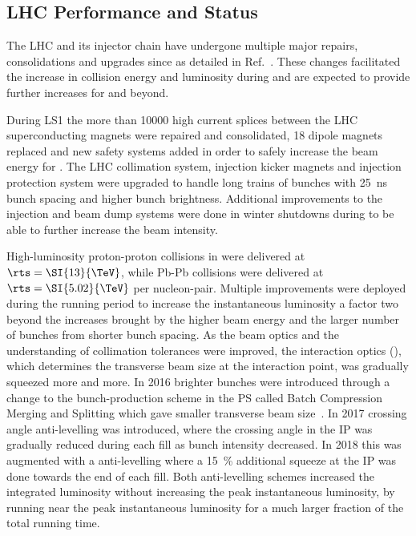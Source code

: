 \documentclass[cernpreprint, atlasdraft=false, UKenglish,british,orcidlogo, texmf, orcidlogo]{atlasdoc}
\begin{document}
\subsection{LHC Performance and Status}
\label{ss:LHC}

 
The \gls{LHC} and its injector chain have undergone multiple major
repairs, consolidations and upgrades since \RunOne as detailed in Ref.~\cite{LHCcontributionInThisJournal}.
These changes facilitated the increase in collision energy and luminosity during \RunTwo
and are expected to provide further increases for \RunThr and beyond.
 
During \gls{LS1} the more than \num{10000} high current splices between the
LHC superconducting magnets were repaired and consolidated, 18 dipole
magnets replaced and new safety systems added in order to safely
increase the beam energy for \RunTwo. The \gls{LHC} collimation
system, injection kicker magnets and injection protection system were
upgraded to handle long trains of bunches with \SI{25}{\ns} bunch
spacing and higher bunch brightness. Additional improvements to the
injection and beam dump systems were done in winter shutdowns during
\RunTwo to be able to further increase the beam intensity.
 
High-luminosity proton-proton collisions in \RunTwo were delivered at
$\rts = \SI{13}{\TeV}$, while Pb-Pb collisions were delivered at $\rts
= \SI{5.02}{\TeV}$ per nucleon-pair. Multiple improvements were
deployed during the running period to increase the instantaneous
luminosity a factor two beyond the increases brought by the higher
beam energy and the larger number of bunches from shorter bunch
spacing. As the beam optics and the understanding of collimation
tolerances were improved, the interaction optics (\betastar), which determines the transverse beam size at the interaction point, was gradually squeezed more and more. In 2016 brighter bunches were introduced
through a change to the bunch-production scheme in the \gls{PS} called Batch Compression Merging and Splitting 
which gave smaller transverse beam size~\cite{Steerenberg:2259071}.  In 2017 crossing angle
anti-levelling was introduced, where the crossing angle in the
\gls{IP} was gradually reduced during each fill as bunch
intensity decreased. In 2018 this was augmented with a \betastar
anti-levelling
where a \SI{15}{\percent} additional squeeze at the \gls{IP}
was done towards the end of each fill. Both anti-levelling schemes
increased the integrated luminosity without increasing the peak
instantaneous luminosity, by running near the peak instantaneous luminosity for a much larger fraction of the total running time.
 
\end{document}
